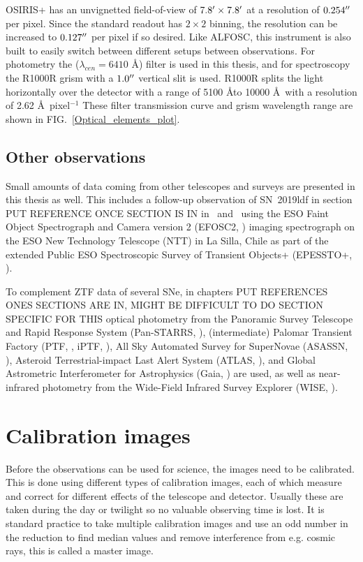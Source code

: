 \documentclass[a4paper,oneside,12pt, class=Latex/Classes/PhDthesisPSnPDF, crop=false]{standalone}
\begin{document}
OSIRIS+ has an unvignetted field-of-view of $7.8^{\prime}\times7.8^{\prime}$ at a resolution of $0.254^{\prime\prime}$ per pixel. Since the standard readout has $2\times2$ binning, the resolution can be increased to $0.127^{\prime\prime}$ per pixel if so desired. Like ALFOSC, this instrument is also built to easily switch between different setups between observations. For photometry the \ztfr ($\lambda_{cen} =6410$ \AA) filter is used in this thesis, and for spectroscopy the R1000R grism with a $1.0^{\prime\prime}$ vertical slit is used. R1000R splits the light horizontally over the detector with a range of 5100 \AA to 10000 \AA\ with a resolution of 2.62 \AA\ pixel$^{-1}$ These filter transmission curve and grism wavelength range are shown in FIG.~\ref{Optical_elements_plot}.


\subsection{Other observations}
Small amounts of data coming from other telescopes and surveys are presented in this thesis as well. This includes a follow-up observation of SN~2019ldf in section \color{red} PUT REFERENCE ONCE SECTION IS IN \color{black} in \ztfg\ and \ztfr\ using the ESO Faint Object Spectrograph and Camera version 2 (EFOSC2, \citealt{EFOSC2}) imaging spectrograph on the ESO New Technology Telescope (NTT) in La Silla, Chile as part of the extended Public ESO Spectroscopic Survey of Transient Objects+ (EPESSTO+, \citealt{PESSTO}).

To complement ZTF data of several SNe, in chapters \color{red} PUT REFERENCES ONES SECTIONS ARE IN, MIGHT BE DIFFICULT TO DO SECTION SPECIFIC FOR THIS \color{black} optical photometry from the Panoramic Survey Telescope and Rapid Response System (Pan-STARRS, \citealt{Pan-STARRS1}), (intermediate) Palomar Transient Factory (PTF, \citealt{PTF_1, PTF_2}, iPTF, \citealt{iPTF}), All Sky Automated Survey for SuperNovae (ASASSN, \citealt{ASASSN_paper1, ASASSN_catalog}), Asteroid Terrestrial-impact Last Alert System (ATLAS, \citealt{ATLAS}),  and Global Astrometric Interferometer for Astrophysics (Gaia, \citealt{Gaia}) are used, as well as near-infrared photometry from the Wide-Field Infrared Survey Explorer (WISE, \citealt{WISE}).


\section{Calibration images}
\label{calibration}
Before the observations can be used for science, the images need to be calibrated. This is done using different types of calibration images, each of which measure and correct for different effects of the telescope and detector. Usually these are taken during the day or twilight so no valuable observing time is lost. It is standard practice to take multiple calibration images and use an odd number in the reduction to find median values and remove interference from e.g. cosmic rays, this is called a master image.
\end{document}

